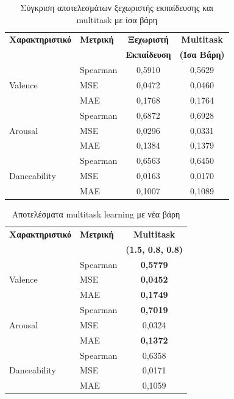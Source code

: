 \documentclass[a4paper,12pt]{article}
\begin{document}
\begin{table}[H]
    \centering
    \small
    \begin{tabular}{llcc}
    \toprule
    \textbf{Χαρακτηριστικό} & \textbf{Μετρική} & \textbf{Ξεχωριστή} & \textbf{Multitask} \\
    & & \textbf{Εκπαίδευση} & \textbf{(Ίσα Βάρη)} \\
    \midrule
    \multirow{3}{*}{Valence} 
    & Spearman & 0,5910 & 0,5629 \\
    & MSE & 0,0472 & 0,0460 \\
    & MAE & 0,1768 & 0,1764 \\
    \midrule
    \multirow{3}{*}{Arousal}
    & Spearman & 0,6872 & 0,6928 \\
    & MSE & 0,0296 & 0,0331 \\
    & MAE & 0,1384 & 0,1379 \\
    \midrule
    \multirow{3}{*}{Danceability}
    & Spearman & 0,6563 & 0,6450 \\
    & MSE & 0,0163 & 0,0170 \\
    & MAE & 0,1007 & 0,1089 \\
    \bottomrule
    \end{tabular}
    \caption{Σύγκριση αποτελεσμάτων ξεχωριστής εκπαίδευσης και multitask με ίσα βάρη}
    \label{tab:results1}
\end{table}

\begin{table}[H]
    \centering
    \small
    \begin{tabular}{llc}
    \toprule
    \textbf{Χαρακτηριστικό} & \textbf{Μετρική} & \textbf{Multitask} \\
    & & \textbf{(1.5, 0.8, 0.8)} \\
    \midrule
    \multirow{3}{*}{Valence} 
    & Spearman & \textbf{0,5779} \\
    & MSE & \textbf{0,0452} \\
    & MAE & \textbf{0,1749} \\
    \midrule
    \multirow{3}{*}{Arousal}
    & Spearman & \textbf{0,7019} \\
    & MSE & 0,0324 \\
    & MAE & \textbf{0,1372} \\
    \midrule
    \multirow{3}{*}{Danceability}
    & Spearman & 0,6358 \\
    & MSE & 0,0171 \\
    & MAE & 0,1059 \\
    \bottomrule
    \end{tabular}
    \caption{Αποτελέσματα multitask learning με νέα βάρη}
    \label{tab:results2}
\end{table}
\end{document}
